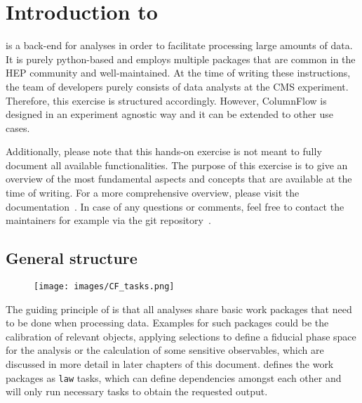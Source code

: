 \chapter{Introduction to \columnflow}
\columnflow is a back-end for analyses in order to facilitate processing large amounts of data.
It is purely python-based and employs multiple packages that are common in the HEP community and well-maintained.
At the time of writing these instructions, the team of developers purely consists of data analysts at the CMS experiment.
Therefore, this exercise is structured accordingly. However, ColumnFlow is designed in an experiment agnostic way and it can be extended to other use cases.

Additionally, please note that this hands-on exercise is not meant to fully document all available functionalities.
The purpose of this exercise is to give an overview of the most fundamental aspects and concepts that are available at the time of writing.
For a more comprehensive overview, please visit the documentation~\cite{cf_repo}. %
In case of any questions or comments, feel free to contact the maintainers for example via the git repository~\cite{cf_repo}.

\section{General structure}
\begin{figure}[p]
	\centering
	\texttt{[image: images/CF\_tasks.png]}
	\label{fig:task_graph}
\end{figure}

The guiding principle of \columnflow is that all analyses share basic work packages that need to be done when processing data.
Examples for such packages could be the calibration of relevant objects, applying selections to define a fiducial phase space for the analysis or the calculation of some sensitive observables, which are discussed in more detail in later chapters of this document.
\columnflow defines the work packages as \texttt{law} tasks, which can define dependencies amongst each other and will only run necessary tasks to obtain the requested output.


